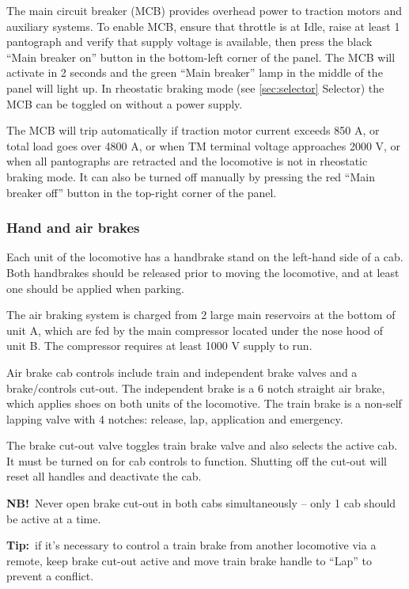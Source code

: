\documentclass[11pt, a4paper]{article}
\newcommand{\brakemode}[1]{%
    \begingroup
    \setlength{\fboxsep}{0pt}%
    \raisebox{0.1em}{%
        \colorbox{red}{%
            \parbox[c][1.4em][c]{1.4em}{%
                \centering
                \color{black}\bfseries #1%
            }%
        }%
    }%
    \endgroup
}
\newcommand{\NB}{\textbf{NB!}}
\newcommand{\Tip}{\textbf{Tip:}}
\begin{document}
The main circuit breaker (MCB) provides overhead power to traction motors and auxiliary systems. To enable MCB, ensure that throttle is at Idle, raise at least 1 pantograph and verify that supply voltage is available, then press the black ``Main breaker on'' button in the bottom-left corner of the panel. The MCB will activate in 2 seconds and the green ``Main breaker'' lamp in the middle of the panel will light up. In rheostatic braking \brakemode{R} mode (see \ref{sec:selector} Selector) the MCB can be toggled on without a power supply.

The MCB will trip automatically if traction motor current exceeds 850 A, or total load goes over 4800 A, or when TM terminal voltage approaches 2000 V, or when all pantographs are retracted and the locomotive is not in rheostatic braking \brakemode{R} mode. It can also be turned off manually by pressing the red ``Main breaker off'' button in the top-right corner of the panel.

\subsubsection{Hand and air brakes}
Each unit of the locomotive has a handbrake stand on the left-hand side of a cab. Both handbrakes should be released prior to moving the locomotive, and at least one should be applied when parking.

The air braking system is charged from 2 large main reservoirs at the bottom of unit A, which are fed by the main compressor located under the nose hood of unit B. The compressor requires at least 1000 V supply to run.

Air brake cab controls include train and independent brake valves and a brake/controls cut-out. The independent brake is a 6 notch straight air brake, which applies shoes on both units of the locomotive. The train brake is a non-self lapping valve with 4 notches: release, lap, application and emergency.

The brake cut-out valve toggles train brake valve and also selects the active cab. It must be turned on for cab controls to function. Shutting off the cut-out will reset all handles and deactivate the cab.

\NB\ Never open brake cut-out in both cabs simultaneously -- only 1 cab should be active at a time.

\Tip\ if it's necessary to control a train brake from another locomotive via a remote, keep brake cut-out active and move train brake handle to ``Lap'' to prevent a conflict.
\end{document}
